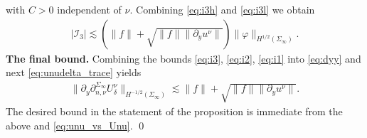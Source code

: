\documentclass[report]{elsarticle}
\numberwithin{theorem}{section}
\begin{document}
with $C>0$ independent of $\nu$. 
Combining \eqref{eq:i3h} and \eqref{eq:i3l} we obtain 
\begin{align}
	\label{eq:i3}
	|\mathcal{I}_{3}|\lesssim (\|f\|+\sqrt{\|f\|\|\partial_y u^{\nu}\|})\|\varphi\|_{H^{1/2}(\Sigma_{\infty})}.
\end{align}
\textbf{The final bound. }Combining the bounds \eqref{eq:i3}, \eqref{eq:i2}, \eqref{eq:i1} into \eqref{eq:dyy} and next \eqref{eq:unudelta_trace} yields
\begin{align*}
	\|\partial_y\partial_{n,\nu}^{\Sigma_{\infty}}U^{\nu}_{\delta}\|_{H^{-1/2}(\Sigma_{\infty})}\lesssim \|f\|+\sqrt{\|f\|\|\partial_y u^{\nu}\|}.
\end{align*}
The desired bound in the statement of the proposition is immediate from the above and \eqref{eq:unu_vs_Unu}. \qed
\end{document}
